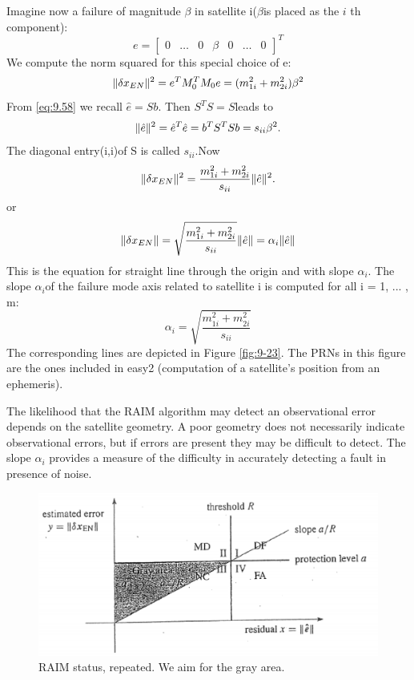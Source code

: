 		Imagine now a failure of magnitude $\beta$ in satellite i($\beta$is placed as the $i$ th component):
		\begin{equation}\label{eq:9.66}
			e=
			\begin{bmatrix}
			0 & \ldots & 0 & \beta & 0 & \ldots & 0
			\end{bmatrix}^T
		\end{equation}
		We compute the norm squared for this special choice of e:
		\begin{equation*}
			\Arrowvert \delta x_{EN} \Arrowvert^2 = e^TM^T_0M_0e = (m^2_{1i}+m^2_{2i})\beta^2
		\end{equation*}
		From \ref{eq:9.58} we recall $\hat{e} = Sb$. Then $S^TS=S$leads to
		\begin{equation*}
			\Arrowvert \hat{e} \Arrowvert^2 = \hat{e}^T\hat{e} = b^TS^TSb = s_{ii}\beta^2.
		\end{equation*}
		The diagonal entry(i,i)of S is called $s_{ii}$.Now
		\begin{equation*}
			\Arrowvert \delta x_{EN} \Arrowvert ^2 = \dfrac{m^2_{1i}+m^2_{2i}}{s_{ii}}\Arrowvert \hat{e} \Arrowvert ^2.
		\end{equation*}
		or
		\begin{equation}\label{eq:9.67}
			\Arrowvert \delta x_{EN} \Arrowvert = \sqrt{\dfrac{m^2_{1i}+m^2_{2i}}{s_{ii}}}\Arrowvert \hat{e} \Arrowvert = \alpha_i \Arrowvert \hat{e} \Arrowvert
		\end{equation}
		This is the equation for straight line through the origin and with slope $\alpha_i$. The slope $\alpha_i$of the failure mode axis related to satellite i is computed for all i = 1, ... , m:
		\begin{equation}\label{eq:9.68}
			\alpha_i = \sqrt{\dfrac{m^2_{1i}+m^2_{2i}}{s_{ii}}}
		\end{equation}
		The corresponding lines are depicted in Figure \ref{fig:9-23}. The PRNs in this figure are the ones included in easy2 (computation of a satellite’s position from an ephemeris).
		
		The likelihood that the RAIM algorithm may detect an observational error depends on the satellite geometry. A poor geometry does not necessarily indicate observational errors, but if errors are present they may be difficult to detect. The slope $\alpha_i$ provides a measure of the difficulty in accurately detecting a fault in presence of noise.
		\begin{figure}
			\centering
			\includegraphics[width=0.7\linewidth]{TeX_files/Part03/chapter09/image/9-24}
			\caption{RAIM status, repeated. We aim for the gray area.}
			\label{fig:9-24}
		\end{figure}
		
